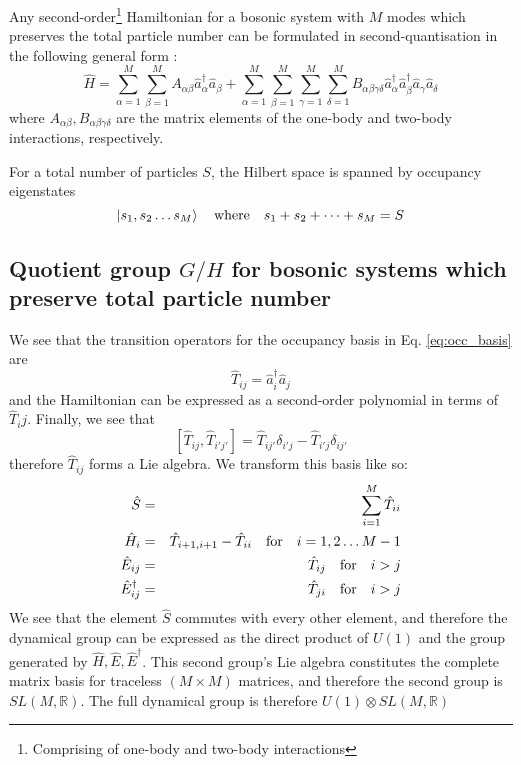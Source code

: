 \documentclass[12pt]{article}
\begin{document}
	Any second-order\footnote{Comprising of one-body and two-body interactions} Hamiltonian for a bosonic system with $M$ modes which preserves the total particle number can be formulated in second-quantisation in the following general form \cite[p. 3]{green}:
	\begin{equation}
	\hat{H} = \sum_{\alpha=1}^M\sum_{\beta=1}^M A_{\alpha\beta}\hat{a}^\dagger_\alpha\hat{a}_\beta + \sum_{\alpha=1}^M\sum_{\beta=1}^M\sum_{\gamma=1}^M\sum_{\delta=1}^M B_{\alpha\beta\gamma\delta}\hat{a}^\dagger_\alpha\hat{a}^\dagger_\beta\hat{a}_\gamma\hat{a}_\delta
	\end{equation}
	where $A_{\alpha\beta}, B_{\alpha\beta\gamma\delta}$ are the matrix elements of the one-body and two-body interactions, respectively.
	
	For a total number of particles $S$, the Hilbert space is spanned by occupancy eigenstates
	\begin{equation}\label{eq:occ_basis}
	\ket{s_1,s_2\dots s_M}\qq{where} s_1+s_2+\dots + s_M = S
	\end{equation}
	
	\subsection{Quotient group $G/H$ for bosonic systems which preserve total particle number}
	
	We see that the transition operators for the occupancy basis in Eq. \ref{eq:occ_basis} are
	\begin{equation}
		\hat{T}_{ij}=\hat{a}^\dagger_i\hat{a}_j
	\end{equation}
	and the Hamiltonian can be expressed as a second-order polynomial in terms of $\hat{T}_ij$. Finally, we see that
	\begin{equation}
	\left[\hat{T}_{ij}, \hat{T}_{i'j'}\right]=\hat{T}_{ij'}\delta_{i'j}-\hat{T}_{i'j}\delta_{ij'}
	\end{equation}
	therefore $\hat{T}_{ij}$ forms a Lie algebra. We transform this basis like so:
	\begin{eqnarray*}
	\hat{S}&=&\sum_{i=1}^M\hat{T}_{ii}\\
	\hat{H}_i&=&\hat{T}_{i+1,i+1}-\hat{T}_{ii}\qq{for}i=1,2\dots M-1\\
	\hat{E}_{ij}&=&\hat{T}_{ij}\qq{for}i>j\\
	\hat{E}_{ij}^\dagger &=&\hat{T}_{ji}\qq{for}i>j
	\end{eqnarray*}
	We see that the element $\hat{S}$ commutes with every other element, and therefore the dynamical group can be expressed as the direct product of $U(1)$ and the group generated by $\hat{H},\hat{E},\hat{E}^\dagger$. This second group's Lie algebra constitutes the complete matrix basis for traceless $(M\times M)$ matrices, and therefore the second group is $SL(M,\mathbb{R})$. The full dynamical group is therefore $U(1)\otimes SL(M,\mathbb{R})$
	
\end{document}
